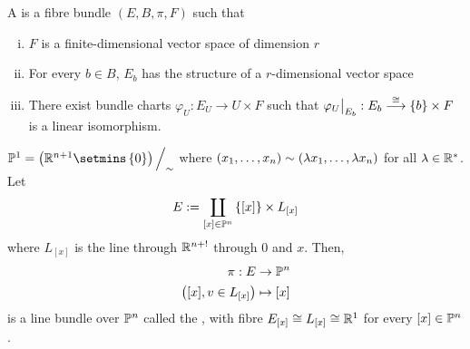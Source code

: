\documentclass[main.tex]{subfiles}
\begin{document}
 A  is a fibre bundle $(E, B, \pi, F)$ such that
\begin{enumerate}[(i)]
    \item $F$ is a finite-dimensional vector space of dimension $r$
    \item For every $b \in B$, $E_b$ has the structure of a $r$-dimensional vector space
    \item There exist bundle charts $\varphi_U : E_U \to U \times F$ such that $\varphi_U\big|_{E_b} : E_b \overset{\cong}{\longrightarrow} \left\{b\right\} \times F$ is a linear isomorphism.
\end{enumerate}

\begin{exmp}
 $\mathbb{P}^1 = \br{\R^{n+1} \setmins \brc{0}} \Big/_\sim$ where $\left( x_1, \dots, x_n \right) \sim \left( \lambda x_1, \dots, \lambda x_n \right)$ for all $\lambda \in \mathbb{R}^*$. Let
\[
E := \coprod_{[x] \in \mathbb{P}^n} \left\{[x]\right\} \times L_{[x]}
\] where $L_[x]$ is the line through $\mathbb{R}^{n+!}$ through $0$ and $x$.
Then,
\begin{align*}
    \pi: E &\to \mathbb{P}^n \\
        \left( [x], v \in L_{[x]}  \right) &\mapsto [x]
\end{align*}
is a line bundle over $\mathbb{P}^n$ called the , with fibre $E_{[x]} \cong L_{[x]} \cong \mathbb{R}^1$ for every $[x] \in \mathbb{P}^n$.


\end{exmp}
\end{document}
